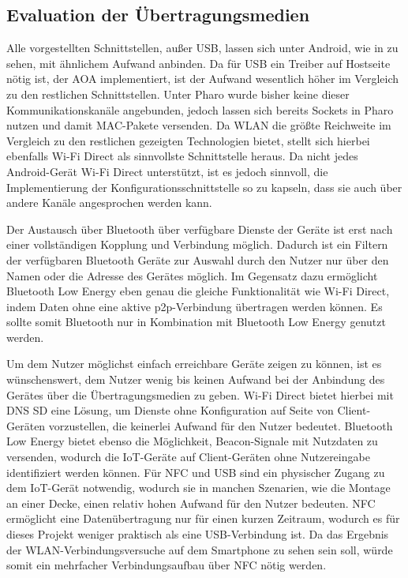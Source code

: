     \subsection{Evaluation der Übertragungsmedien}
    Alle vorgestellten Schnittstellen, außer USB, lassen sich unter Android, wie in \cite{test-repository} zu sehen, mit ähnlichem Aufwand anbinden.
    Da für USB ein Treiber auf Hostseite nötig ist, der AOA implementiert, ist der Aufwand wesentlich höher im Vergleich zu den restlichen Schnittstellen.
    Unter Pharo wurde bisher keine dieser Kommunikationskanäle angebunden,
    jedoch lassen sich bereits Sockets in Pharo nutzen und damit MAC-Pakete versenden.
    Da WLAN die größte Reichweite im Vergleich zu den restlichen gezeigten Technologien bietet, stellt sich hierbei ebenfalls Wi-Fi Direct als sinnvollste Schnittstelle heraus.
    Da nicht jedes Android-Gerät Wi-Fi Direct unterstützt, ist es jedoch sinnvoll, die Implementierung der Konfigurationsschnittstelle so zu kapseln,
    dass sie auch über andere Kanäle angesprochen werden kann.
    
    Der Austausch über Bluetooth über verfügbare Dienste der Geräte ist erst nach einer vollständigen Kopplung und Verbindung möglich.
    Dadurch ist ein Filtern der verfügbaren Bluetooth Geräte zur Auswahl durch den Nutzer nur über den Namen oder die Adresse des Gerätes möglich.
    Im Gegensatz dazu ermöglicht Bluetooth Low Energy eben genau die gleiche Funktionalität wie Wi-Fi Direct, indem Daten ohne eine aktive p2p-Verbindung übertragen werden können. Es sollte somit Bluetooth nur in Kombination mit Bluetooth Low Energy genutzt werden.

    Um dem Nutzer möglichst einfach erreichbare Geräte zeigen zu können, ist es wünschenswert, dem Nutzer wenig bis keinen Aufwand bei der Anbindung des Gerätes über die Übertragungsmedien zu geben.
    Wi-Fi Direct bietet hierbei mit DNS SD eine Lösung, um Dienste ohne Konfiguration auf Seite von Client-Geräten vorzustellen, die keinerlei Aufwand für den Nutzer bedeutet.
    Bluetooth Low Energy bietet ebenso die Möglichkeit, Beacon-Signale mit Nutzdaten zu versenden, wodurch die IoT-Geräte auf Client-Geräten ohne Nutzereingabe identifiziert werden können.
    Für NFC und USB sind ein physischer Zugang zu dem IoT-Gerät notwendig, wodurch sie in manchen Szenarien, wie die Montage an einer Decke, einen relativ hohen Aufwand für den Nutzer bedeuten.
    NFC ermöglicht eine Datenübertragung nur für einen kurzen Zeitraum, wodurch es für dieses Projekt weniger praktisch als eine USB-Verbindung ist.
    Da das Ergebnis der WLAN-Verbindungsversuche auf dem Smartphone zu sehen sein soll, würde somit ein mehrfacher Verbindungsaufbau über NFC nötig werden.
